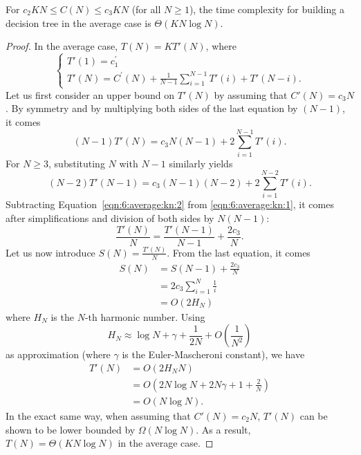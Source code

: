\begin{theorem}\label{thm:6:average:kn}
For $c_2 K N \leq C(N) \leq c_3 K N$ (for all $N \geq 1$), the time complexity for building a decision
tree in the average case is $\Theta(K N \log N)$.
\end{theorem}

\begin{proof}
In the average case, $T(N) = K T'(N)$, where
\begin{equation}
\begin{cases}
T'(1) = c_1^\prime \\
T'(N) = C^\prime(N) +  \frac{1}{N-1} \sum_{i=1}^{N-1} T'(i) + T'(N-i).
\end{cases}
\end{equation}
Let us first consider an upper bound on $T'(N)$ by assuming that $C'(N) = c_3 N$.
By symmetry and by multiplying both sides of the last equation by $(N-1)$, it comes
\begin{equation}\label{eqn:6:average:kn:1}
(N-1) T'(N) = c_3 N (N-1) +  2 \sum_{i=1}^{N-1} T'(i).
\end{equation}
For $N \geq 3$, substituting $N$ with $N-1$ similarly yields
\begin{equation}\label{eqn:6:average:kn:2}
(N-2) T'(N-1) = c_3 (N-1) (N-2) +  2 \sum_{i=1}^{N-2} T'(i).
\end{equation}
Subtracting Equation~\ref{eqn:6:average:kn:2} from \ref{eqn:6:average:kn:1},
it comes after simplifications and division of both sides by $N(N-1)$:
\begin{equation}
\frac{T'(N)}{N} = \frac{T'(N-1)}{N-1} + \frac{2 c_3}{N}.
\end{equation}
Let us now introduce $S(N) = \frac{T'(N)}{N}$. From the last equation, it comes
\begin{align}
S(N) &= S(N-1) + \frac{2 c_3}{N} \nonumber \\
     &= 2 c_3 \sum_{i=1}^N \frac{1}{i}  \nonumber \\
     &= O(2 H_N)
\end{align}
where $H_N$ is the $N$-th harmonic number. Using
\begin{equation}
H_N \approx \log N + \gamma + \frac{1}{2N} + O(\frac{1}{N^2})
\end{equation}
as approximation (where $\gamma$ is the Euler-Mascheroni constant), we have
\begin{align}
T'(N) &= O(2 H_N N) \nonumber \\
&= O(2 N \log N + 2 N\gamma + 1 + \frac{2}{N}) \nonumber \\
&= O(N \log N).
\end{align}
In the exact same way, when assuming that $C'(N) = c_2 N$, $T'(N)$ can be shown
to be lower bounded by $\Omega(N \log N)$. As a result, $T(N) = \Theta(KN \log N)$ in the average case.
\end{proof}

